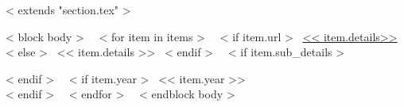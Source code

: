 ~< extends "section.tex" >~

~< block body >~
  ~< for item in items >~
    ~< if item.url >~
      \href{<< item.url >>}{<< item.details>>}
    ~< else >~
      << item.details >>
    ~< endif >~
    ~< if item.sub_details >~
      \par \vspace{-1mm} {\scriptsize
        \color{gray}{<< item.sub_details >>}
      } \par \vspace{3mm}
    ~< endif >~
    ~< if item.year >~
        \hfill << item.year >> \\
    ~< endif >~
  ~< endfor >~
~< endblock body >~